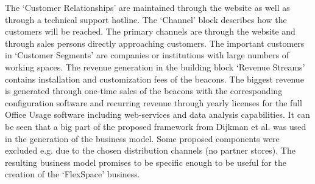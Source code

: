 		\vspace{-1em}
		The `Customer Relationships' are maintained through the website as well as through a technical support hotline. The `Channel' block describes how the customers will be reached. The primary channels are through the website and through sales persons directly approaching customers. The important customers in `Customer Segments' are companies or institutions with large numbers of working spaces. The revenue generation in the building block `Revenue Streams' contains installation and customization fees of the beacons. The biggest revenue is generated through one-time sales of the beacons with the corresponding configuration software and recurring revenue through yearly licenses for the full Office Usage software including web-services and data analysis capabilities. It can be seen that a big part of the proposed framework from Dijkman et al. was used in the generation of the business model. Some proposed components were excluded e.g. due to the chosen distribution channels (no partner stores). The resulting business model promises to be specific enough to be useful for the creation of the `FlexSpace' business.
	\vspace{-1em}
